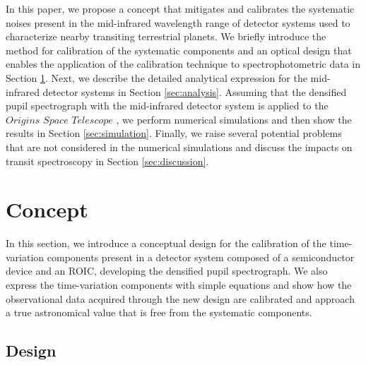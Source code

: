 \documentclass{aastex62}
\begin{document}
In this paper, we propose a concept that mitigates and calibrates the systematic noises present in the mid-infrared wavelength range of detector systems used to characterize nearby transiting terrestrial planets. We briefly introduce the method for calibration of the systematic components and an optical design that enables the application of the calibration technique to spectrophotometric data in Section \ref{sec:concept}. Next, we describe the detailed analytical expression for the mid-infrared detector systems in Section \ref{sec:analysis}. Assuming that the densified pupil spectrograph with the mid-infrared detector system is applied to the $Origins$ $Space$ $Telescope$ \citep{2018arXiv180307730F}, we perform numerical simulations and then show the results in Section \ref{sec:simulation}. Finally, we raise several potential problems that are not considered in the numerical simulations and discuss the impacts on transit spectroscopy in Section \ref{sec:discussion}.


\section{Concept} \label{sec:concept}

In this section, we introduce a conceptual design for the calibration of the time-variation components present in a detector system composed of a semiconductor device and an ROIC, developing the densified pupil spectrograph. We also express the time-variation components with simple equations and show how the observational data acquired through the new design are calibrated and approach a true astronomical value that is free from the systematic components.


\subsection{Design} \label{subsec:design}
\end{document}
